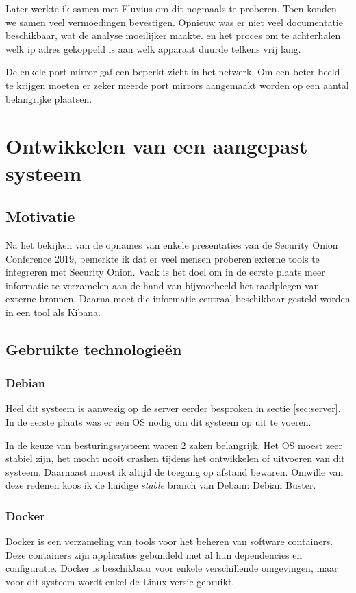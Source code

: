 \documentclass[a4paper,12pt]{report}
\begin{document}
Later werkte ik samen met Fluvius om dit nogmaals te proberen.
Toen konden we samen veel vermoedingen bevestigen.
Opnieuw was er niet veel documentatie beschikbaar, wat de analyse moeilijker maakte.
en het proces om te achterhalen welk ip adres gekoppeld is aan welk apparaat duurde telkens vrij lang.

De enkele port mirror gaf een beperkt zicht in het netwerk.
Om een beter beeld te krijgen moeten er zeker meerde port mirrors aangemaakt worden op een aantal belangrijke plaatsen.

\chapter{Ontwikkelen van een aangepast systeem}
\label{sec:aangepast-systeem}
\section{Motivatie}
Na het bekijken van de opnames van enkele presentaties van de Security Onion Conference 2019, bemerkte ik dat er veel mensen proberen externe tools te integreren met Security Onion.
\autocite{so:conference-2019}
Vaak is het doel om in de eerste plaats meer informatie te verzamelen aan de hand van bijvoorbeeld het raadplegen van externe bronnen.
Daarna moet die informatie centraal beschikbaar gesteld worden in een tool als Kibana.

\section{Gebruikte technologie\"en}
\subsection{Debian}
Heel dit systeem is aanwezig op de server eerder besproken in sectie \ref{sec:server}.
In de eerste plaats was er een OS nodig om dit systeem op uit te voeren.

In de keuze van besturingssysteem waren 2 zaken belangrijk.
Het OS moest zeer stabiel zijn, het mocht nooit crashen tijdens het ontwikkelen of uitvoeren van dit systeem.
Daarnaast moest ik altijd de toegang op afstand bewaren.
Omwille van deze redenen koos ik de huidige \emph{stable} branch van Debain: Debian Buster.

\subsection{Docker}
Docker is een verzameling van tools voor het beheren van software containers.
Deze containers zijn applicaties gebundeld met al hun dependencies en configuratie.
Docker is beschikbaar voor enkele verschillende omgevingen, maar voor dit systeem wordt enkel de Linux versie gebruikt.
\end{document}
